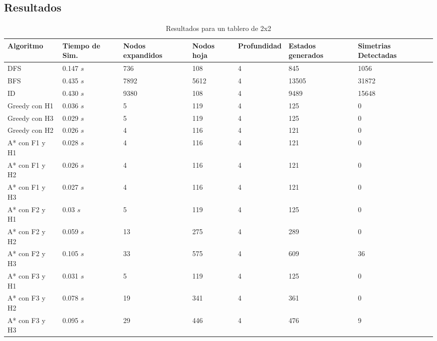 \documentclass[11pt,twocolumn]{article}
\begin{document}
    \subsection{Resultados}
        \begin{table}[htdp]
        \caption{Resultados para un tablero de 2x2}
            	\begin{center}
    				\begin{tabular}{|C{3cm}|C{2cm}|C{2cm}|C{2cm}|C{1.5cm}|C{2cm}|C{2cm}|} \hline
    					Algoritmo & Tiempo de Sim. & Nodos expandidos & Nodos hoja & Profundidad & Estados generados & Simetrias Detectadas \\ \hline\hline
    					DFS & 0.147 $s$ & 736 & 108 & 4 & 845 & 1056\\ \hline
                        BFS & 0.435 $s$ & 7892 & 5612 & 4 & 13505 & 31872\\ \hline
                        ID & 0.430 $s$ & 9380 & 108 & 4 & 9489 & 15648\\ \hline
                        Greedy con H1 & 0.036 $s$ & 5 & 119 & 4 & 125 & 0 \\ \hline
                        Greedy con H3 & 0.029 $s$ & 5 & 119 & 4 & 125 & 0 \\ \hline
                        Greedy con H2 & 0.026 $s$ & 4 & 116 & 4 & 121 & 0 \\ \hline
                        A* con F1 y H1 & 0.028 $s$ & 4 & 116 & 4 & 121 & 0 \\ \hline
                        A* con F1 y H2 & 0.026 $s$ & 4 & 116 & 4 & 121 & 0 \\ \hline
                        A* con F1 y H3 & 0.027 $s$ & 4 & 116 & 4 & 121 & 0 \\ \hline
                        A* con F2 y H1 & 0.03 $s$ & 5 & 119 & 4 & 125 & 0 \\ \hline
                        A* con F2 y H2 & 0.059 $s$ & 13 & 275 & 4 & 289 & 0 \\ \hline
                        A* con F2 y H3 & 0.105 $s$ & 33 & 575 & 4 & 609 & 36 \\ \hline
                        A* con F3 y H1 & 0.031 $s$ & 5 & 119 & 4 & 125 & 0 \\ \hline
                        A* con F3 y H2 & 0.078 $s$ & 19 & 341 & 4 & 361 & 0 \\ \hline
                        A* con F3 y H3 & 0.095 $s$ & 29 & 446 & 4 & 476 & 9 \\ \hline
    				\end{tabular}
    			\end{center}
                \label{table:2x2}
    	\end{table}
\end{document}
